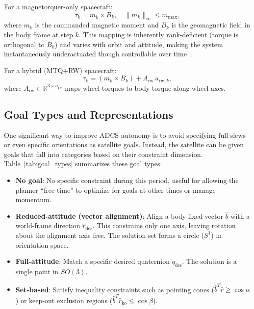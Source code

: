 \documentclass[conference]{IEEEtran}
\begin{document}
For a magnetorquer-only spacecraft:
\begin{equation}\label{eq:mtq_torque}
    \tau_k = m_k \times B_k, \quad \|m_k\|_\infty \le m_{\max},
\end{equation}
where $m_k$ is the commanded magnetic moment and $B_k$ is the geomagnetic field in the body frame at step $k$. This mapping is inherently rank-deficient (torque is orthogonal to $B_k$) and varies with orbit and attitude, making the system instantaneously underactuated though controllable over time~\cite{lovera2004periodic}.

For a hybrid (MTQ+RW) spacecraft:
\begin{equation}\label{eq:hybrid_torque}
    \tau_k = (m_k \times B_k) + A_{\mathrm{rw}}\,u_{\mathrm{rw},k},
\end{equation}
where $A_{\mathrm{rw}}\in\mathbb{R}^{3\times n_{\mathrm{rw}}}$ maps wheel torques to body torque along wheel axes.

\subsection{Goal Types and Representations}\label{subsec:goal_types}

One significant way to improve ADCS autonomy is to avoid specifying full slews or even specific orientations as satellite goals. Instead, the satellite can be given goals that fall into categories based on their constraint dimension. Table~\ref{tab:goal_types} summarizes these goal types:

\begin{itemize}
    \item \textbf{No goal}: No specific constraint during this period, useful for allowing the planner ``free time'' to optimize for goals at other times or manage momentum.

    \item \textbf{Reduced-attitude (vector alignment)}: Align a body-fixed vector $\hat{b}$ with a world-frame direction $\hat{r}_{\text{des}}$. This constrains only one axis, leaving rotation about the alignment axis free. The solution set forms a circle ($S^1$) in orientation space.

    \item \textbf{Full-attitude}: Match a specific desired quaternion $q_{\text{des}}$. The solution is a single point in $SO(3)$.

    \item \textbf{Set-based}: Satisfy inequality constraints such as pointing cones ($\hat{b}^T\hat{r} \geq \cos\alpha$) or keep-out exclusion regions ($\hat{b}^T\hat{r}_{\text{ko}} \leq \cos\beta$).
\end{itemize}
\end{document}
